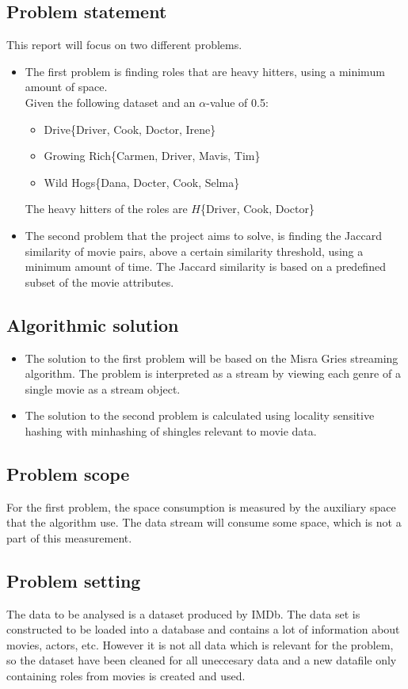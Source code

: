 \subsection{Problem statement}
	This report will focus on two different problems.
\begin{itemize}
	\item The first problem is finding roles that are heavy hitters, using a minimum amount of space. \\ %
	Given the following dataset and an \(\alpha\)-value of 0.5:
	\begin{itemize}
		\item Drive\{Driver, Cook, Doctor, Irene\}
		\item Growing Rich\{Carmen, Driver, Mavis, Tim\}
		\item Wild Hogs\{Dana, Docter, Cook, Selma\}
	\end{itemize}
	The heavy hitters of the roles are \(H\)\{Driver, Cook, Doctor\}
	\item The second problem that the project aims to solve, is finding the Jaccard similarity of movie pairs, above a certain similarity threshold, using a minimum amount of time. The Jaccard similarity is based on a predefined subset of the movie attributes.
	
\end{itemize}

\subsection{Algorithmic solution}
\begin{itemize}
	\item The solution to the first problem will be based on the Misra Gries streaming algorithm. The problem is interpreted as a stream by viewing each genre of a single movie as a stream object.
	\item The solution to the second problem is calculated using locality sensitive hashing with minhashing of shingles relevant to movie data.
\end{itemize}

\subsection{Problem scope}
For the first problem, the space consumption is measured by the auxiliary space that the algorithm use. The data stream will consume some space, which is not a part of this measurement.

\subsection{Problem setting}
The data to be analysed is a dataset produced by IMDb. The data set is constructed to be loaded into a database and contains a lot of information about movies, actors, etc. However it is not all data which is relevant for the problem, so the dataset have been cleaned for all uneccesary data and a new datafile only containing roles from movies is created and used.